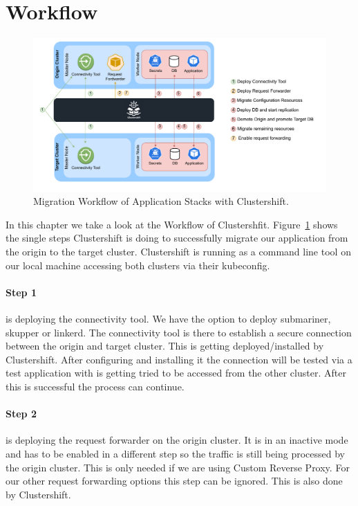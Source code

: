 %
\section{Workflow}
\label{sec:workflow}
%
\begin{figure}
    \centering
    \includegraphics[width=\linewidth]{figures/workflow.pdf}
    \caption{Migration Workflow of Application Stacks with Clustershift.}
    \label{fig:workflow}
\end{figure}
%
In this chapter we take a look at the Workflow of Clustershfit. Figure~\ref{fig:workflow} shows the single steps Clustershift is doing to successfully migrate our application from the origin to the target cluster. Clustershift is running as a command line tool on our local machine accessing both clusters via their kubeconfig.
\paragraph{Step 1} is deploying the connectivity tool. We have the option to deploy submariner, skupper or linkerd. The connectivity tool is there to establish a secure connection between the origin and target cluster. This is getting deployed/installed by Clustershift. After configuring and installing it the connection will be tested via a test application with is getting tried to be accessed from the other cluster. After this is successful the process can continue.
\paragraph{Step 2} is deploying the request forwarder on the origin cluster. It is in an inactive mode and has to be enabled in a different step so the traffic is still being processed by the origin cluster. This is only needed if we are using Custom Reverse Proxy. For our other request forwarding options this step can be ignored. This is also done by Clustershift.
